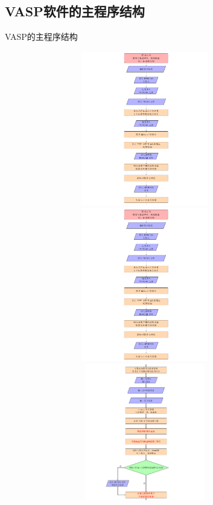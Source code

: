 {\subsection{\rm{VASP}软件的主程序结构}
\begin{frame}[allowframebreaks]{\textrm{VASP}的主程序结构}
\begin{figure}[h!]
\vskip -10pt
\centering
\includegraphics[height=2.65in,width=4.0in,viewport=0 360 562 720,clip]{Figures/VASP_main_Flow-1.png}
\includegraphics[height=2.65in,width=4.0in,viewport=0 0 562 360,clip]{Figures/VASP_main_Flow-1.png}
\includegraphics[height=2.35in,width=4.0in,viewport=0 370 562 680,clip]{Figures/VASP_main_Flow-2.png}

\end{figure}
\end{frame}}

